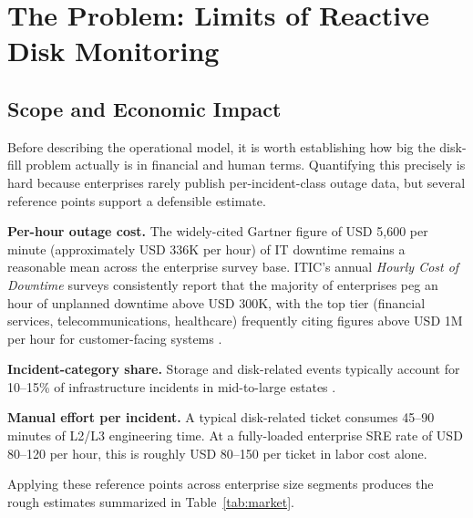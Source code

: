 \documentclass[conference]{IEEEtran}
\begin{document}
\section{The Problem: Limits of Reactive Disk Monitoring}
\label{sec:problem}

\subsection{Scope and Economic Impact}

Before describing the operational model, it is worth establishing
how big the disk-fill problem actually is in financial and human
terms. Quantifying this precisely is hard because enterprises rarely
publish per-incident-class outage data, but several reference points
support a defensible estimate.

\textbf{Per-hour outage cost.} The widely-cited Gartner figure of
USD 5{,}600 per minute (approximately USD 336K per hour) of IT
downtime \cite{lerner2014downtime} remains a reasonable mean across
the enterprise survey base. ITIC's annual \emph{Hourly Cost of
Downtime} surveys consistently report that the majority of
enterprises peg an hour of unplanned downtime above USD 300K, with
the top tier (financial services, telecommunications, healthcare)
frequently citing figures above USD 1M per hour for customer-facing
systems \cite{itic2022downtime}.

\textbf{Incident-category share.} Storage and disk-related events
typically account for 10--15\% of infrastructure incidents in
mid-to-large estates \cite{notaro2021aiops,salfner2010survey}.

\textbf{Manual effort per incident.} A typical disk-related ticket
consumes 45--90 minutes of L2/L3 engineering time. At a fully-loaded
enterprise SRE rate of USD 80--120 per hour, this is roughly USD
80--150 per ticket in labor cost alone.

Applying these reference points across enterprise size segments
produces the rough estimates summarized in Table~\ref{tab:market}.
\end{document}
